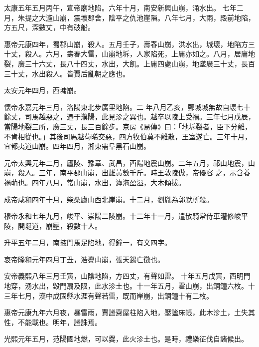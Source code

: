 \begin{pinyinscope}
 太康五年五月丙午，宣帝廟地陷。六年十月，南安新興山崩，涌水出。
 七年二月，朱提之大瀘山崩，震壞郡舍，陰平之仇池崖隕。八年七月，大雨，殿前地陷，方五尺，深數丈，中有破船。



 惠帝元康四年，蜀郡山崩，殺人。五月壬子，壽春山崩，洪水出，城壞，地陷方三十丈，殺人。六月，壽春大雷，山崩地坼，人家陷死，上庸亦如之。八月，居庸地裂，廣三十六丈，長八十四丈，水出，大飢。上庸四處山崩，地墜廣三十丈，長百三十丈，水出殺人。皆賈后亂朝之應也。



 太安元年四月，西墉崩。



 懷帝永嘉元年三月，洛陽東北步廣里地陷。二
 年八月乙亥，鄄城城無故自壞七十餘丈，司馬越惡之，遷于濮陽，此見沴之異也。越卒以陵上受禍。三年七月戊辰，當陽地裂三所，廣三丈，長三百餘步。京房《易傳》曰：「地坼裂者，臣下分離，不肯相從也。」其後司馬越茍晞交惡，四方牧伯莫不離散，王室遂亡。三年十月，宜都夷道山崩。四年四月，湘東需阜黑石山崩。



 元帝太興元年二月，廬陵、豫章、武昌，西陽地震山崩。二年五月，祁山地震，山崩，殺人。三年，南平郡山崩，出雄黃數千斤。時王敦陵傲，帝優容
 之，示含養禍萌也。四年八月，常山崩，水出，滹沲盈溢，大木傾拔。



 成帝咸和四年十月，柴桑廬山西北崖崩。十二月，劉胤為郭默所殺。



 穆帝永和七年九月，峻平、崇陽二陵崩。十二年十一月，遣散騎常侍車灌修峻平陵，開埏道，崩壓，殺數十人。



 升平五年二月，南掖門馬足陷地，得鐘一，有文四字。



 哀帝隆和元年四月丁丑，浩亹山崩，張天錫亡徵也。



 安帝義熙八年三月壬寅，山陰地陷，方四丈，有聲如雷。
 十年五月戊寅，西明門地穿，湧水出，毀門扇及限，此水沴土也。十一年五月，霍山崩，出銅鐘六枚。十三年七月，漢中成固縣水涯有聲若雷，既而岸崩，出銅鐘十有二枚。



 惠帝元康九年六月夜，暴雷雨，賈謐齋屋柱陷入地，壓謐床帳，此木沴土，土失其性，不能載也。明年，謐誅焉。



 光熙元年五月，范陽國地燃，可以爨，此火沴土也。是時，禮樂征伐自諸候出。




\end{pinyinscope}
